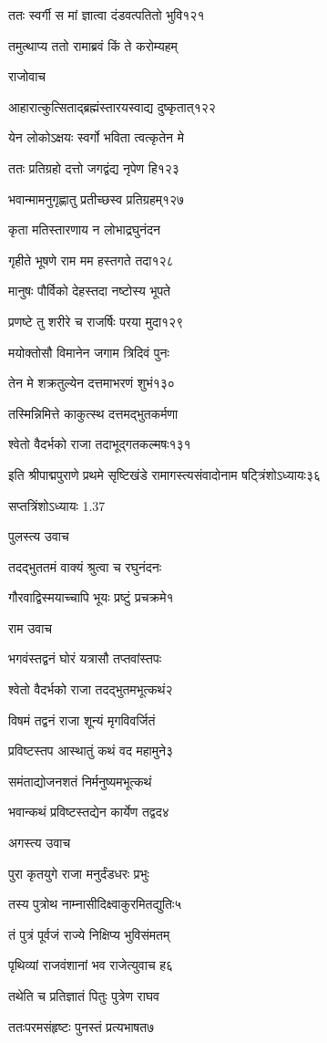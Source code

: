 ततः स्वर्गी स मां ज्ञात्वा दंडवत्पतितो भुवि१२१

तमुत्थाप्य ततो रामाब्रवं किं ते करोम्यहम्

राजोवाच

आहारात्कुत्सिताद्ब्रह्मंस्तारयस्वाद्य दुष्कृतात्१२२

येन लोकोऽक्षयः स्वर्गो भविता त्वत्कृतेन मे

ततः प्रतिग्रहो दत्तो जगद्वंद्य नृपेण हि१२३

भवान्मामनुगृह्णातु प्रतीच्छस्व प्रतिग्रहम्१२७

कृता मतिस्तारणाय न लोभाद्रघुनंदन

गृहीते भूषणे राम मम हस्तगते तदा१२८

मानुषः पौर्विको देहस्तदा नष्टोस्य भूपते

प्रणष्टे तु शरीरे च राजर्षिः परया मुदा१२९

मयोक्तोसौ विमानेन जगाम त्रिदिवं पुनः

तेन मे शक्रतुल्येन दत्तमाभरणं शुभं१३०

तस्मिन्निमित्ते काकुत्स्थ दत्तमद्भुतकर्मणा

श्वेतो वैदर्भको राजा तदाभूद्गतकल्मषः१३१

इति श्रीपाद्मपुराणे प्रथमे सृष्टिखंडे रामागस्त्यसंवादोनाम षट्त्रिंशोऽध्यायः३६

सप्तत्रिंशोऽध्यायः 1.37

पुलस्त्य उवाच

तदद्भुततमं वाक्यं श्रुत्वा च रघुनंदनः

गौरवाद्विस्मयाच्चापि भूयः प्रष्टुं प्रचक्रमे१

राम उवाच

भगवंस्तद्वनं घोरं यत्रासौ तप्तवांस्तपः

श्वेतो वैदर्भको राजा तदद्भुतमभूत्कथं२

विषमं तद्वनं राजा शून्यं मृगविवर्जितं

प्रविष्टस्तप आस्थातुं कथं वद महामुने३

समंताद्योजनशतं निर्मनुष्यमभूत्कथं

भवान्कथं प्रविष्टस्तद्येन कार्येण तद्वद४

अगस्त्य उवाच

पुरा कृतयुगे राजा मनुर्दंडधरः प्रभुः

तस्य पुत्रोथ नाम्नासीदिक्ष्वाकुरमितद्युतिः५

तं पुत्रं पूर्वजं राज्ये निक्षिप्य भुविसंमतम्

पृथिव्यां राजवंशानां भव राजेत्युवाच ह६

तथेति च प्रतिज्ञातं पितुः पुत्रेण राघव

ततःपरमसंहृष्टः पुनस्तं प्रत्यभाषत७

